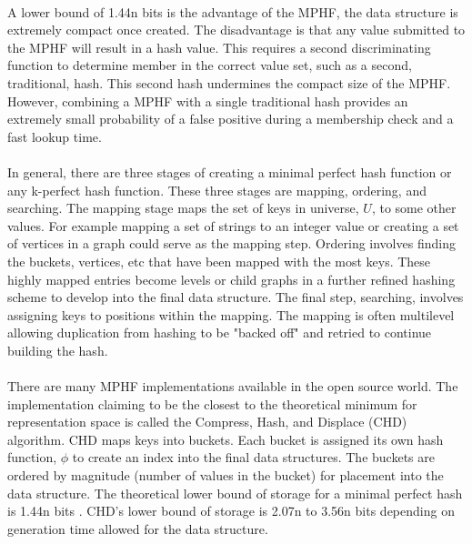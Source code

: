 			\paragraph{}A lower bound of 1.44n bits is the advantage of the MPHF, the data structure is extremely compact once created.  The disadvantage is that any value submitted to the MPHF will result in a hash value.  This requires a second discriminating function to determine member in the correct value set, such as a second, traditional, hash.  This second hash undermines the compact size of the MPHF.  However, combining a MPHF with a single traditional hash provides an extremely small probability of a false positive during a membership check and a fast lookup time.
			\paragraph{} In general, there are three stages of creating a minimal perfect hash function or any k-perfect hash function.  These three stages are mapping, ordering, and searching.  The mapping stage maps the set of keys in universe, $U$, to some other values.  For example mapping a set of strings to an integer value or creating a set of vertices in a graph could serve as the mapping step.  Ordering involves finding the buckets, vertices, etc that have been mapped with the most keys.  These highly mapped entries become levels or child graphs in a further refined hashing scheme to develop into the final data structure. The final step, searching, involves assigning keys to positions within the mapping.  The mapping is often multilevel allowing duplication from hashing to be "backed off" and retried to continue building the hash.			
			\paragraph{}There are many MPHF implementations available in the open source world.  The implementation claiming to be the closest to the theoretical minimum for representation space is called the Compress, Hash, and Displace (CHD) algorithm\cite{_cmph_????}.  CHD maps keys into buckets.  Each bucket is assigned its own hash function, $\phi$ to create an index into the final data structures.  The buckets are ordered by magnitude (number of values in the bucket) for placement into the data structure.  The theoretical lower bound of storage for a minimal perfect hash is 1.44n bits \cite{belazzougui_hash_2009}.  CHD's lower bound of storage is 2.07n to 3.56n bits depending on generation time allowed for the data structure.

